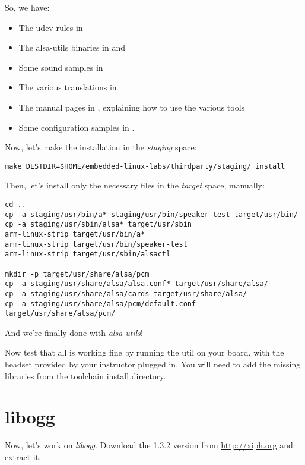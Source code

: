 So, we have:
\begin{itemize}
\item The udev rules in 
\item The alsa-utils binaries in  and 
\item Some sound samples in 
\item The various translations in 
\item The manual pages in , explaining how to
  use the various tools
\item Some configuration samples in .
\end{itemize}

Now, let's make the installation in the {\em staging} space:

\begin{verbatim}
make DESTDIR=$HOME/embedded-linux-labs/thirdparty/staging/ install
\end{verbatim}

Then, let's install only the necessary files in the {\em target}
space, manually:

\begin{verbatim}
cd ..
cp -a staging/usr/bin/a* staging/usr/bin/speaker-test target/usr/bin/
cp -a staging/usr/sbin/alsa* target/usr/sbin
arm-linux-strip target/usr/bin/a*
arm-linux-strip target/usr/bin/speaker-test
arm-linux-strip target/usr/sbin/alsactl

mkdir -p target/usr/share/alsa/pcm
cp -a staging/usr/share/alsa/alsa.conf* target/usr/share/alsa/
cp -a staging/usr/share/alsa/cards target/usr/share/alsa/
cp -a staging/usr/share/alsa/pcm/default.conf target/usr/share/alsa/pcm/
\end{verbatim}

And we're finally done with {\em alsa-utils}!

Now test that all is working fine by running the  util on
your board, with the headset provided by your instructor plugged
in. You will need to add the missing libraries from the toolchain
install directory.

\section{libogg}

Now, let's work on {\em libogg}. Download the 1.3.2 version from
\url{http://xiph.org} and extract it.


